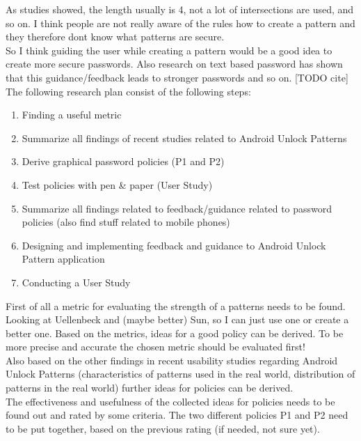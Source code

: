 \documentclass[twocolumn, a4paper, 10pt]{article}
\begin{document}
As studies showed, the length usually is 4, not a lot of intersections are used, and so on. I think people are not really aware of the rules how to create a pattern and they therefore dont know what patterns are secure.\\

So I think guiding the user while creating a pattern would be a good idea to create more secure passwords. Also research on text based password has shown that this guidance/feedback leads to stronger passwords and so on. [TODO cite]\\

The following research plan consist of the following steps:\\

\begin{enumerate}
\item Finding a useful metric
\item Summarize all findings of recent studies related to Android Unlock Patterns
\item Derive graphical password policies (P1 and P2)
\item Test policies with pen \& paper (User Study)
\item Summarize all findings related to feedback/guidance related to password policies (also find stuff related to mobile phones)
\item Designing and implementing feedback and guidance to Android Unlock Pattern application
\item Conducting a User Study
\end{enumerate}

First of all a metric for evaluating the strength of a patterns needs to be found. Looking at Uellenbeck and (maybe better) Sun, so I can just use one or create a better one. Based on the metrics, ideas for a good policy can be derived. To be more precise and accurate the chosen metric should be evaluated first!\\

Also based on the other findings in recent usability studies regarding Android Unlock Patterns (characteristics of patterns used in the real world, distribution of patterns in the real world) further ideas for policies can be derived.\\

The effectiveness and usefulness of the collected ideas for policies needs to be found out and rated by some criteria. The two different policies P1 and P2 need to be put together, based on the previous rating (if needed, not sure yet).\\
\end{document}
